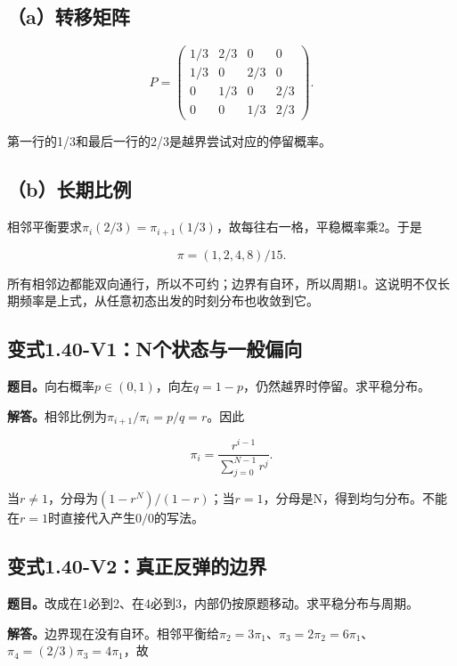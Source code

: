 \documentclass[
  11pt,
  a4paper,
  UTF8,
  fontset=fandol]{ctexart}
\begin{document}
\subsection{（a）转移矩阵}\label{aux8f6cux79fbux77e9ux9635-1}

\[
\boxed{P=\begin{pmatrix}
1/3&2/3&0&0\\1/3&0&2/3&0\\0&1/3&0&2/3\\0&0&1/3&2/3
\end{pmatrix}.}
\]

第一行的1/3和最后一行的2/3是越界尝试对应的停留概率。

\subsection{（b）长期比例}\label{bux957fux671fux6bd4ux4f8b}

相邻平衡要求\(\pi_i(2/3)=\pi_{i+1}(1/3)\)，故每往右一格，平稳概率乘2。于是

\[
\boxed{\pi=(1,2,4,8)/15.}
\]

所有相邻边都能双向通行，所以不可约；边界有自环，所以周期1。这说明不仅长期频率是上式，从任意初态出发的时刻分布也收敛到它。

\subsection{变式1.40-V1：N个状态与一般偏向}\label{ux53d8ux5f0f1.40-v1nux4e2aux72b6ux6001ux4e0eux4e00ux822cux504fux5411}

\textbf{题目。}向右概率\(p\in(0,1)\)，向左\(q=1-p\)，仍然越界时停留。求平稳分布。

\textbf{解答。}相邻比例为\(\pi_{i+1}/\pi_i=p/q=r\)。因此

\[
\boxed{\pi_i=\frac{r^{i-1}}{\sum_{j=0}^{N-1}r^j}.}
\]

当\(r\ne1\)，分母为\((1-r^N)/(1-r)\)；当\(r=1\)，分母是N，得到均匀分布。不能在\(r=1\)时直接代入产生\(0/0\)的写法。

\subsection{变式1.40-V2：真正反弹的边界}\label{ux53d8ux5f0f1.40-v2ux771fux6b63ux53cdux5f39ux7684ux8fb9ux754c}

\textbf{题目。}改成在1必到2、在4必到3，内部仍按原题移动。求平稳分布与周期。

\textbf{解答。}边界现在没有自环。相邻平衡给\(\pi_2=3\pi_1\)、\(\pi_3=2\pi_2=6\pi_1\)、\(\pi_4=(2/3)\pi_3=4\pi_1\)，故
\end{document}
